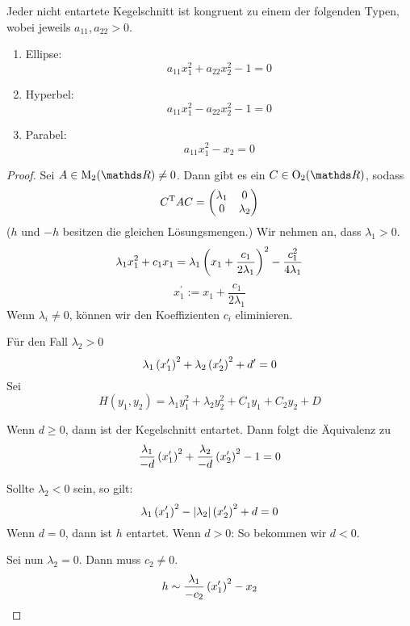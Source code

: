 		\begin{theorem}
			Jeder nicht entartete Kegelschnitt ist kongruent zu einem der folgenden Typen, wobei jeweils $a_11,a_22>0$.
			\begin{enumerate}[label=\normalfont(\roman*)]
				\item Ellipse:
					\[ a_11x_1^2 + a_22x_2^2 - 1 = 0 \]
				\item Hyperbel:
					\[ a_{11}x_1^2 - a_22x_2^2 - 1 = 0 \]
				\item Parabel:
					\[ a_{11}x_1^2 - x_2 = 0 \]
			\end{enumerate}
		\end{theorem}
		\begin{proof}
			Sei $A\in\m{M}_2(\SR)\neq 0$.
			Dann gibt es ein $C\in\m{O}_2(\SR)$, sodass
			\[
				C^\mathrm{T} AC =
				\begin{pmatrix}
					\lambda_1 & 0 \\ 0 & \lambda_2
				\end{pmatrix}
			\]
			($h$ und $-h$ besitzen die gleichen Lösungsmengen.)
			Wir nehmen an, dass $\lambda_1>0$.
			\[ \lambda_1 x_1^2 + c_1x_1 = \lambda_1\left(  x_1 + \frac{c_1}{2\lambda_1}  \right)^2 - \frac{c_1^2}{4\lambda_1} \]
			\[ x_1^\prime := x_1 + \frac{c_1}{2\lambda_1} \]
			Wenn $\lambda_i\neq 0$, können wir den Koeffizienten $c_i$ eliminieren.

			Für den Fall $\lambda_2 >0$
			\[ \lambda_1\left( x_1^\prime \right)^2 + \lambda_2\left(  x_2^\prime  \right)^2 + d^\prime = 0 \]
			Sei 
			\[ H(y_1,y_2) = \lambda_1y_1^2 + \lambda_2y_2^2 + C_1y_1 + C_2y_2 + D \]

			Wenn $d\geq 0$, dann ist der Kegelschnitt entartet.
			Dann folgt die Äquivalenz zu
			\[ \frac{\lambda_1}{-d}\left( x_1^\prime \right)^2 + \frac{\lambda_2}{-d}\left( x_2^\prime \right)^2 - 1 = 0 \]

			Sollte $\lambda_2 < 0$ sein, so gilt:
			\[ \lambda_1\left( x_1^\prime \right)^2 - \left\vert \lambda_2 \right\vert\left( x_2^\prime \right)^2 + d = 0 \]
			Wenn $d=0$, dann ist $h$ entartet.
			Wenn $d>0$: So bekommen wir $d<0$.

			Sei nun $\lambda_2 = 0$.
			Dann muss $c_2 \neq 0$.
			\[ h\sim \frac{\lambda_1}{-c_2}\left(  x_1^\prime  \right)^2 - x_2 \]
		\end{proof}

